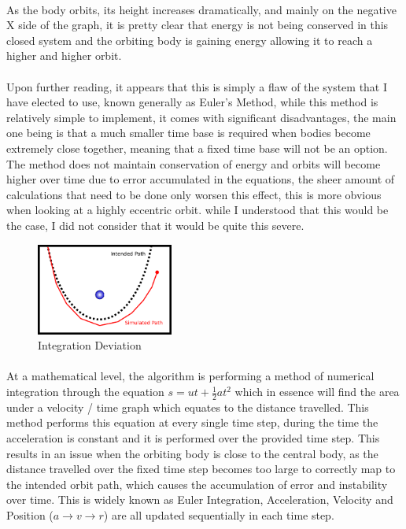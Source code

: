 \paragraph{}
As the body orbits, its height increases dramatically, and mainly on the negative X side of the graph, it is pretty clear that energy is not being conserved in this closed system and the orbiting body is gaining energy allowing it to reach a higher and higher orbit.

\paragraph{}
Upon further reading, it appears that this is simply a flaw of the system that I have elected to use, known generally as Euler's Method, while this method is relatively simple to implement, it comes with significant disadvantages, the main one being is that a much smaller time base is required when bodies become extremely close together, meaning that a fixed time base will not be an option. The method does not maintain conservation of energy and orbits will become higher over time due to error accumulated in the equations, the sheer amount of calculations that need to be done only worsen this effect, this is more obvious when looking at a highly eccentric orbit. while I understood that this would be the case, I did not consider that it would be quite this severe.

\begin{figure}
  \centering
  \includegraphics[width=0.4\textwidth]{img/orbitbad.png}
  \caption{Integration Deviation}
  \vspace{-10pt}
\end{figure}

\paragraph{}
At a mathematical level, the algorithm is performing a method of numerical integration through the equation $s=ut+\frac{1}{2}at^2$ which in essence will find the area under a velocity / time graph which equates to the distance travelled. This method performs this equation at every single time step, during the time the acceleration is constant and it is performed over the provided time step. This results in an issue when the orbiting body is close to the central body, as the distance travelled over the fixed time step becomes too large to correctly map to the intended orbit path, which causes the accumulation of error and instability over time. This is widely known as Euler Integration, Acceleration, Velocity and Position ($a \rightarrow v \rightarrow r$) are all updated sequentially in each time step.

